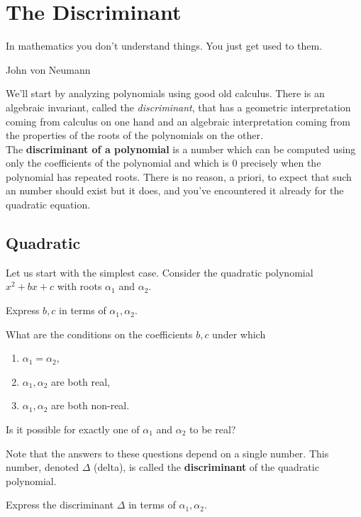 
\section{The Discriminant}
\epigraph{In mathematics you don't understand things. You just get used to them.}{John von Neumann}

We'll start by analyzing polynomials using good old calculus. There is an algebraic invariant, called the \emph{discriminant}, that has a geometric interpretation coming from calculus on one hand and an algebraic interpretation coming from the properties of the roots of the polynomials on the other.\\

The \textbf{discriminant of a polynomial} is a number which can be computed using only the coefficients of the polynomial and which is 0 precisely when the polynomial has repeated roots. There is no reason, a priori, to expect that such an number should exist but it does, and you've encountered it already for the quadratic equation.






\subsection{Quadratic}
	
Let us start with the simplest case. Consider the quadratic polynomial $ x^2 + bx + c$ with roots $ \alpha_1$ and $ \alpha_2$.
\begin{questions}
  \item Express $ b, c$ in terms of $ \alpha_1, \alpha_2$.
\end{questions}
\begin{questions}[resume]
	\item What are the conditions on the coefficients $ b,c$ under which
	\begin{enumerate}
		\item $ \alpha_1 = \alpha_2$,
		\item $ \alpha_1, \alpha_2$ are both real,
		\item $ \alpha_1, \alpha_2$ are both non-real.
	\end{enumerate}
	Is it possible for exactly one of $ \alpha_1$ and $ \alpha_2$ to be real?
\end{questions}
Note that the answers to these questions depend on a single number. This number, denoted $ \Delta$ (delta), is called the \textbf{discriminant} of the quadratic polynomial. 
	\begin{questions}[resume]
		  \item Express the discriminant $ \Delta$ in terms of $ \alpha_1, \alpha_2$.		
	\end{questions}

